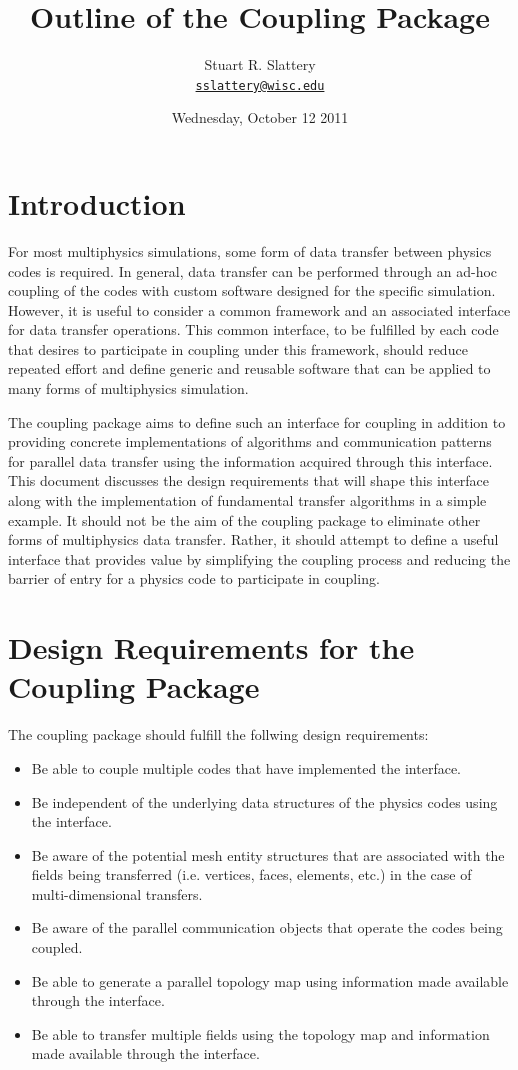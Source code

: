 \documentclass[letterpaper]{article}
\author{Stuart R. Slattery
\\ \href{mailto:sslattery@wisc.edu}{\texttt{sslattery@wisc.edu}}
}
\date{Wednesday, October 12 2011}
\title{Outline of the Coupling Package}
\begin{document}
\maketitle

\section{Introduction}
For most multiphysics simulations, some form of data transfer between
physics codes is required. In general, data transfer can be performed
through an ad-hoc coupling of the codes with custom software designed
for the specific simulation. However, it is useful to consider a
common framework and an associated interface for data transfer
operations. This common interface, to be fulfilled by each code that
desires to participate in coupling under this framework, should reduce
repeated effort and define generic and reusable software that can be
applied to many forms of multiphysics simulation.

The coupling package aims to define such an interface for coupling in
addition to providing concrete implementations of algorithms and
communication patterns for parallel data transfer using the
information acquired through this interface. This document discusses
the design requirements that will shape this interface along with the
implementation of fundamental transfer algorithms in a simple example.
It should not be the aim of the coupling package to eliminate other
forms of multiphysics data transfer. Rather, it should attempt to
define a useful interface that provides value by simplifying the
coupling process and reducing the barrier of entry for a physics code
to participate in coupling. 

\section{Design Requirements for the Coupling Package}
The coupling package should fulfill the follwing design
requirements:

\begin{itemize}
\item Be able to couple multiple codes that have implemented the
  interface.
\item Be independent of the underlying data structures of the physics
  codes using the interface.
\item Be aware of the potential mesh entity structures that are
  associated with the fields being transferred (i.e. vertices, faces,
  elements, etc.) in the case of multi-dimensional transfers.
\item Be aware of the parallel communication objects that operate the
  codes being coupled.
\item Be able to generate a parallel topology map using information
  made available through the interface.
\item Be able to transfer multiple fields using the topology map and
  information made available through the interface.
\end{itemize}
\end{document}
